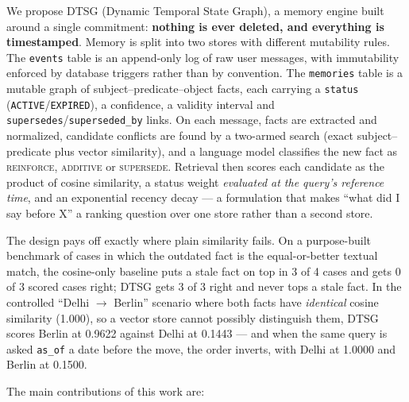 \documentclass[11pt,a4paper]{article}
\begin{document}
We propose DTSG (Dynamic Temporal State Graph), a memory engine built around a
single commitment: \textbf{nothing is ever deleted, and everything is
timestamped}. Memory is split into two stores with different mutability rules.
The \texttt{events} table is an append-only log of raw user messages, with
immutability enforced by database triggers rather than by convention. The
\texttt{memories} table is a mutable graph of subject--predicate--object facts,
each carrying a \texttt{status} (\texttt{ACTIVE}/\texttt{EXPIRED}), a
confidence, a validity interval and \texttt{supersedes}/\texttt{superseded\_by}
links. On each message, facts are extracted and normalized, candidate conflicts
are found by a two-armed search (exact subject--predicate plus vector
similarity), and a language model classifies the new fact as
\textsc{reinforce}, \textsc{additive} or \textsc{supersede}. Retrieval then
scores each candidate as the product of cosine similarity, a status weight
\emph{evaluated at the query's reference time}, and an exponential recency
decay --- a formulation that makes ``what did I say before X'' a ranking
question over one store rather than a second store.

The design pays off exactly where plain similarity fails. On a purpose-built
benchmark of cases in which the outdated fact is the equal-or-better textual
match, the cosine-only baseline puts a stale fact on top in 3 of 4 cases and
gets 0 of 3 scored cases right; DTSG gets 3 of 3 right and never tops a stale
fact. In the controlled ``Delhi $\to$ Berlin'' scenario where both facts have
\emph{identical} cosine similarity (1.000), so a vector store cannot possibly
distinguish them, DTSG scores Berlin at 0.9622 against Delhi at 0.1443 --- and
when the same query is asked \texttt{as\_of} a date before the move, the order
inverts, with Delhi at 1.0000 and Berlin at 0.1500.

\noindent The main contributions of this work are:
\end{document}
